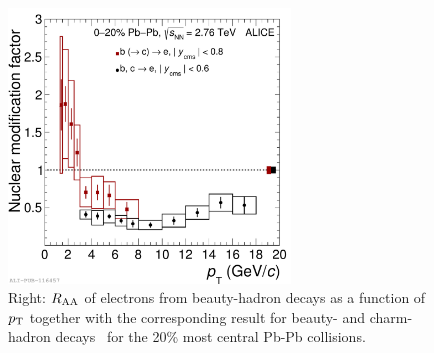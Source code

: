 \begin{figure}[!ht]
  \centering
    \includegraphics[width=7.5cm]{FigCap2/2017-Jan-28-rParAAbeautyincl.pdf}
  \caption{Right: $R_{\rm AA}$ of electrons from beauty-hadron decays as a function of $p_{\rm T}$ together with
the corresponding result for beauty- and charm-hadron decays~\cite{Adam:2016khe} for the 20\% most central Pb-Pb collisions.}
  \label{fig:ColorMassDep}
\end{figure}

